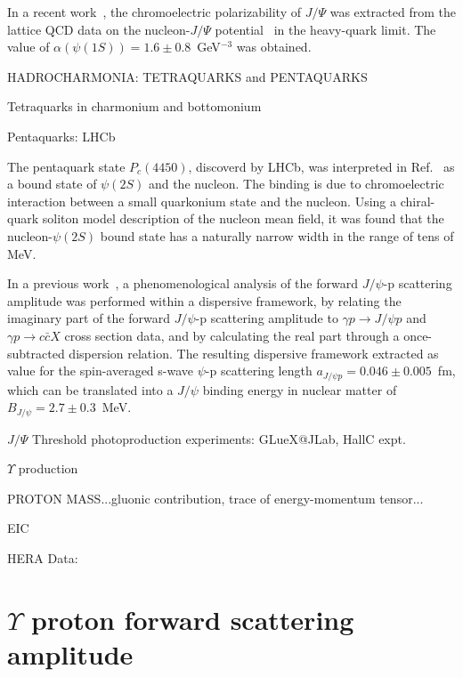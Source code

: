 \documentclass[10pt,prd,aps,nofootinbib,superscriptaddress]{revtex4}
\begin{document}
In a recent work~\cite{Polyakov:2018aey}, the chromoelectric polarizability of $J/\Psi$ was extracted from the lattice QCD data on the nucleon-$J/\Psi$ potential~\cite{Sugiura:2017vks}  in the heavy-quark limit. The value of $\alpha(\psi(1S)) = 1.6 \pm 0.8$~GeV$^{-3}$ was obtained.





HADROCHARMONIA:  TETRAQUARKS and PENTAQUARKS

Tetraquarks in charmonium and bottomonium

Pentaquarks: LHCb~\cite{Aaij:2015tga}

The pentaquark state $P_c(4450)$, discoverd by LHCb, was interpreted in Ref.~\cite{Eides:2015dtr} as a bound state of $\psi(2S)$ and the nucleon. The binding is due to chromoelectric interaction between a small quarkonium state and the nucleon.
Using a chiral-quark soliton model description of the nucleon mean field, it was found that the nucleon-$\psi(2S)$ bound state has a naturally narrow width in the range of tens of MeV.



In a previous work~\cite{Gryniuk:2016mpk}, a phenomenological analysis of the forward $J/\psi$-p scattering amplitude was performed within a dispersive framework, by relating the imaginary part of the forward $J/\psi$-p scattering amplitude 
to $\gamma p \to J/\psi p$ and $\gamma p \to c \bar c X$ cross section data, and by calculating the real part through a once-subtracted dispersion relation.  
The resulting dispersive framework extracted as value for the 
spin-averaged s-wave $\psi$-p scattering length $a_{J/\psi p} = 0.046 \pm 0.005$~fm, which can be translated into a 
$J/\psi$ binding energy in nuclear matter 
of $B_{J/\psi} = 2.7 \pm 0.3$~MeV. 

$J/\Psi$ Threshold photoproduction experiments: GLueX@JLab, HallC expt.


$\Upsilon$ production

PROTON MASS...gluonic contribution, trace of energy-momentum tensor...

EIC

HERA Data: \cite{Behnke:2015qja}

\newpage

\section{$\Upsilon$ proton forward scattering amplitude}
\end{document}
